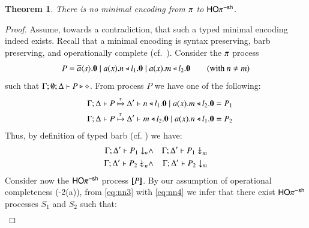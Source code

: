 \documentclass[preprint,11pt]{elsarticle}
\newtheorem{theorem}{Theorem}[section]
\begin{document}
{%

\begin{theorem}%
	\label{t:negative}
	There is no minimal encoding from
		$\pi$ to $\mathsf{HO}\pi^{\mathsf{-sh}}$.
\end{theorem}


\begin{proof}
	Assume, towards a contradiction, that such a typed minimal encoding indeed exists. 
	Recall that a minimal encoding is syntax preserving,
	barb preserving, 
	and operationally complete (cf.~).
	Consider the $\pi$ process
	\[
		P = \overline{a} \langle s \rangle . \mathbf{0} \;|\; a (x) . n \triangleleft l_1 . \mathbf{0} \;|\; a (x) . m \triangleleft l_2 . \mathbf{0} \qquad \text{(with $n \neq m$)}
	\]
	\noi such that 
	$\Gamma; \emptyset; \Delta \vdash P \triangleright \diamond$.
	From process $P$ we have one of the following: %
	\begin{eqnarray}
		& & \Gamma; \Delta \vdash P \xmapsto{\tau} \Delta' \vdash n \triangleleft l_1 . \mathbf{0} \;|\; a (x) . m \triangleleft l_2 . \mathbf{0} = P_1 \label{eq:nn3} \\
		& & \Gamma; \Delta \vdash P \xmapsto{\tau} \Delta' \vdash m \triangleleft l_2 . \mathbf{0} \;|\; a (x) . n \triangleleft l_1 . \mathbf{0} = P_2 \label{eq:nn4}
	\end{eqnarray}
	Thus, by definition of typed barb (cf. ) we  have:
	\begin{eqnarray}
		\Gamma; \Delta' \vdash P_1 \downarrow_{n} & \land & 
		\Gamma; \Delta' \vdash P_1 \not\downarrow_{m} \label{eq:nn1} \\
		\Gamma; \Delta' \vdash P_2 \not\downarrow_{n}  & \land & 
		 \Gamma; \Delta' \vdash P_2 \downarrow_{m}
		\label{eq:nn2}
	\end{eqnarray}
	Consider now the $\mathsf{HO}\pi^{\mathsf{-sh}}$ process $[\!\![P]\!\!]$.
	By our assumption of operational completeness 
	(-2(a)), 
	from \eqref{eq:nn3} with \eqref{eq:nn4}
	we infer that
	there exist $\mathsf{HO}\pi^{\mathsf{-sh}}$ processes $S_1$ and $S_2$ such that:
	\begin{eqnarray}

\end{eqnarray}
\end{proof}}
\end{document}
